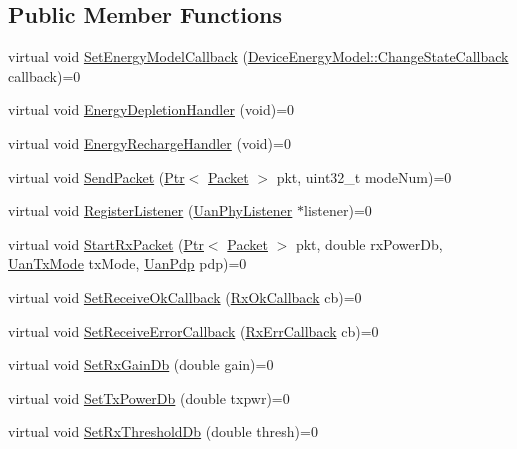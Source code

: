 \subsection*{Public Member Functions}
\begin{DoxyCompactItemize}
\item 
virtual void \hyperlink{classns3_1_1UanPhy_a0065aa68b38dc5ede6231fff67f03e8b}{Set\+Energy\+Model\+Callback} (\hyperlink{classns3_1_1DeviceEnergyModel_a26632ed1b86ee8f6c7fc4c756f0027ad}{Device\+Energy\+Model\+::\+Change\+State\+Callback} callback)=0
\item 
virtual void \hyperlink{classns3_1_1UanPhy_a95efa4adcb52c8468c31b0bd022ec434}{Energy\+Depletion\+Handler} (void)=0
\item 
virtual void \hyperlink{classns3_1_1UanPhy_a59b7f049d7d0510a498444ab6ada811c}{Energy\+Recharge\+Handler} (void)=0
\item 
virtual void \hyperlink{classns3_1_1UanPhy_acf6edcd5eefae18a091b5d5a2344b9af}{Send\+Packet} (\hyperlink{classns3_1_1Ptr}{Ptr}$<$ \hyperlink{classns3_1_1Packet}{Packet} $>$ pkt, uint32\+\_\+t mode\+Num)=0
\item 
virtual void \hyperlink{classns3_1_1UanPhy_a7d42c3a5f5a8f4c88cc759bd22a308ef}{Register\+Listener} (\hyperlink{classns3_1_1UanPhyListener}{Uan\+Phy\+Listener} $\ast$listener)=0
\item 
virtual void \hyperlink{classns3_1_1UanPhy_a5da60932ad3a8dd497963e11d1014caa}{Start\+Rx\+Packet} (\hyperlink{classns3_1_1Ptr}{Ptr}$<$ \hyperlink{classns3_1_1Packet}{Packet} $>$ pkt, double rx\+Power\+Db, \hyperlink{classns3_1_1UanTxMode}{Uan\+Tx\+Mode} tx\+Mode, \hyperlink{classns3_1_1UanPdp}{Uan\+Pdp} pdp)=0
\item 
virtual void \hyperlink{classns3_1_1UanPhy_ad752e39cfd108910f89acf8eb7ac4857}{Set\+Receive\+Ok\+Callback} (\hyperlink{classns3_1_1UanPhy_a0b4ce695657b1c0b7f52ae474f3d98f9}{Rx\+Ok\+Callback} cb)=0
\item 
virtual void \hyperlink{classns3_1_1UanPhy_aaaa510dbfb4fe8ed34f85e83e798c56d}{Set\+Receive\+Error\+Callback} (\hyperlink{classns3_1_1UanPhy_ae0da6892a65ba998fb1d649f31b118c4}{Rx\+Err\+Callback} cb)=0
\item 
virtual void \hyperlink{classns3_1_1UanPhy_a728a677753a91bdf03b312d23eafc365}{Set\+Rx\+Gain\+Db} (double gain)=0
\item 
virtual void \hyperlink{classns3_1_1UanPhy_a0ea5b58f15c40b555e8c25ec6ceaa8c0}{Set\+Tx\+Power\+Db} (double txpwr)=0
\item 
virtual void \hyperlink{classns3_1_1UanPhy_ab3ea11a699c1eade20a9d39712050fdb}{Set\+Rx\+Threshold\+Db} (double thresh)=0

\end{DoxyCompactItemize}
